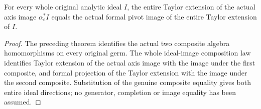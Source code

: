 \begin{theorem}
\label{hir:actual-whole-taylor-axis-ideal-image-dictionary}
\leanok
For every whole original analytic ideal $I$, the entire Taylor
extension of the actual axis image $\alpha_e^*I$ equals the actual
formal pivot image of the entire Taylor extension of $I$.
\end{theorem}
\begin{proof}
The preceding theorem identifies the actual two composite algebra
homomorphisms on every original germ. The whole ideal-image composition
law identifies Taylor extension of the actual axis image with the
image under the first composite, and formal projection of the Taylor
extension with the image under the second composite. Substitution of
the genuine composite equality gives both entire ideal directions;
no generator, completion or image equality has been assumed.
\end{proof}

